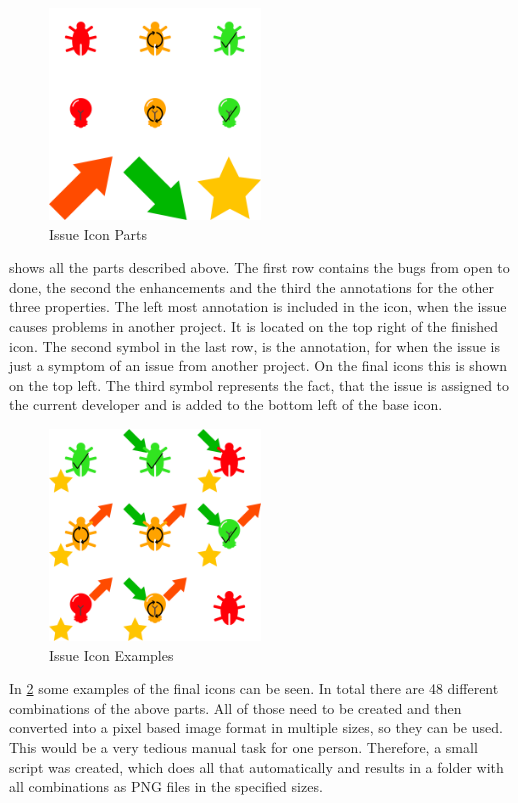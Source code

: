 \begin{figure}[!h]
	\centering
	\includegraphics[width=0.5\textwidth]{graphics/iconParts.png}
	\caption{Issue Icon Parts}
	\label{fig:c4:icon_parts}
\end{figure}
 shows all the parts described above.
The first row contains the bugs from open to done, the second the enhancements and the third the annotations for the other three properties.
The left most annotation is included in the icon, when the issue causes problems in another project.
It is located on the top right of the finished icon.
The second symbol in the last row, is the annotation, for when the issue is just a symptom of an issue from another project.
On the final icons this is shown on the top left.
The third symbol represents the fact, that the issue is assigned to the current developer and is added to the bottom left of the base icon.

\begin{figure}[!h]
	\centering
	\includegraphics[width=0.5\textwidth]{graphics/iconCombinations.png}
	\caption{Issue Icon Examples}
	\label{fig:c4:icon_combinations}
\end{figure}
In \cref{fig:c4:icon_combinations} some examples of the final icons can be seen.
In total there are 48 different combinations of the above parts.
All of those need to be created and then converted into a pixel based image format in multiple sizes, so they can be used.
This would be a very tedious manual task for one person.
Therefore, a small script was created, which does all that automatically and results in a folder with all combinations as \gls{PNG} files in the specified sizes.

